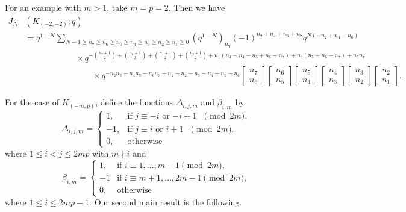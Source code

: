 \documentclass[11pt,reqno]{amsart}
\theoremstyle{definition}
\numberwithin{equation}{section}
\begin{document}
\noindent For an example with $m > 1$, take $m=p=2$.  Then we have
\begin{equation}
\begin{aligned}
J_N&(K_{(-2,-2)};q) \\
 &= q^{1-N} \sum_{N-1 \geq n_7 \geq n_6 \geq n_5 \geq n_4 \geq n_3 \geq n_2 \geq n_1 \geq 0}  (q^{1-N})_{n_7} (-1)^{n_2+n_4+n_6+n_7}q^{N(-n_2+n_4-n_6)} \\
&\qquad \qquad \qquad \times q^{-\binom{n_7+1}{2} + \binom{n_6+1}{2} + \binom{n_4+1}{2} + \binom{n_2+1}{2} +n_1(n_3-n_4-n_5+n_6+n_7) + n_3(n_5-n_6-n_7) +  n_5n_7} \\
& \qquad \qquad \qquad \qquad \times q^{-n_2n_3 -n_4n_5 - n_6n_7 + n_1 - n_2 -n_3 - n_4 + n_5 - n_6}\begin{bmatrix} n_7 \\ n_6 \end{bmatrix} \begin{bmatrix} n_6 \\ n_5 \end{bmatrix} \begin{bmatrix} n_5 \\ n_4 \end{bmatrix} \begin{bmatrix} n_4 \\ n_3\end{bmatrix}  \begin{bmatrix} n_3 \\ n_2 \end{bmatrix} \begin{bmatrix} n_2 \\ n_1 \end{bmatrix}.
\end{aligned}
\end{equation}


For the case of $K_{(-m,p)}$, define the functions $\Delta_{i,j,m}$ and $\beta_{i,m}$ by
\begin{equation} \label{Deltadef}
\Delta_{i,j,m} = 
\begin{cases}
1, &\text{if $j \equiv -i$ or $-i+1$ $\pmod{2m}$}, \\
-1, &\text{if $j \equiv i$ or $i+1$ $\pmod{2m}$}, \\
0, &\text{otherwise}
\end{cases}
\end{equation}
where $1 \leq i < j \leq 2mp$ with $m \nmid i$ and
\begin{equation} \label{betadef}
\beta_{i,m} =
\begin{cases}
1, &\text{if $i \equiv 1,\dots, m-1 \pmod{2m}$}, \\
-1 &\text{if $i \equiv m+1,\dots, 2m-1 \pmod{2m}$}, \\
0, &\text{otherwise} 
\end{cases}
\end{equation}
where $1 \leq i \leq 2mp-1$. Our second main result is the following.
\end{document}
